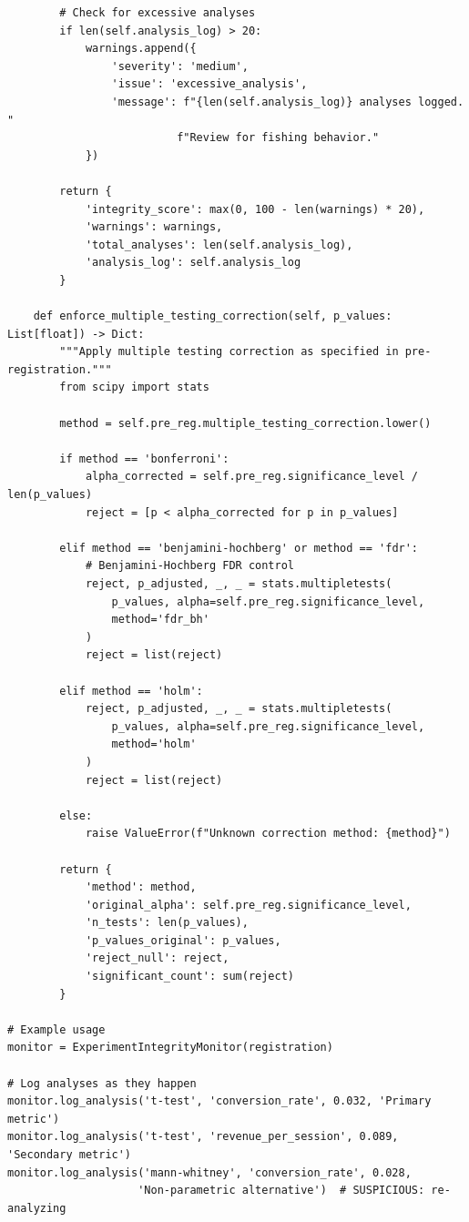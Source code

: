 \begin{lstlisting}
        # Check for excessive analyses
        if len(self.analysis_log) > 20:
            warnings.append({
                'severity': 'medium',
                'issue': 'excessive_analysis',
                'message': f"{len(self.analysis_log)} analyses logged. "
                          f"Review for fishing behavior."
            })

        return {
            'integrity_score': max(0, 100 - len(warnings) * 20),
            'warnings': warnings,
            'total_analyses': len(self.analysis_log),
            'analysis_log': self.analysis_log
        }

    def enforce_multiple_testing_correction(self, p_values: List[float]) -> Dict:
        """Apply multiple testing correction as specified in pre-registration."""
        from scipy import stats

        method = self.pre_reg.multiple_testing_correction.lower()

        if method == 'bonferroni':
            alpha_corrected = self.pre_reg.significance_level / len(p_values)
            reject = [p < alpha_corrected for p in p_values]

        elif method == 'benjamini-hochberg' or method == 'fdr':
            # Benjamini-Hochberg FDR control
            reject, p_adjusted, _, _ = stats.multipletests(
                p_values, alpha=self.pre_reg.significance_level,
                method='fdr_bh'
            )
            reject = list(reject)

        elif method == 'holm':
            reject, p_adjusted, _, _ = stats.multipletests(
                p_values, alpha=self.pre_reg.significance_level,
                method='holm'
            )
            reject = list(reject)

        else:
            raise ValueError(f"Unknown correction method: {method}")

        return {
            'method': method,
            'original_alpha': self.pre_reg.significance_level,
            'n_tests': len(p_values),
            'p_values_original': p_values,
            'reject_null': reject,
            'significant_count': sum(reject)
        }

# Example usage
monitor = ExperimentIntegrityMonitor(registration)

# Log analyses as they happen
monitor.log_analysis('t-test', 'conversion_rate', 0.032, 'Primary metric')
monitor.log_analysis('t-test', 'revenue_per_session', 0.089, 'Secondary metric')
monitor.log_analysis('mann-whitney', 'conversion_rate', 0.028,
                    'Non-parametric alternative')  # SUSPICIOUS: re-analyzing


\end{lstlisting}
